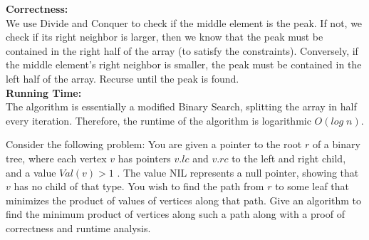 \documentclass[answers]{exam}
\begin{document}
\begin{questions}
\begin{algorithm}
	\DontPrintSemicolon
\end{algorithm}

{\bf Correctness:}\\
We use Divide and Conquer to check if the middle element is the peak. If not, we check if its right neighbor is larger, then we know that the peak must be contained in the right half of the array (to satisfy the constraints). Conversely, if the middle element's right neighbor is smaller, the peak must be contained in the left half of the array. Recurse until the peak is found.\\

{\bf Running Time:}\\
The algorithm is essentially a modified Binary Search, splitting the array in half every iteration. Therefore, the runtime of the algorithm is logarithmic $O(log\;n)$.\\


\vspace{0.2in}





\question[20]
Consider the following problem:  You are given a pointer to the root $r$ of a binary tree, where each vertex $v$
has pointers $v.lc$ and $v.rc$ to the left and right child, and a value $Val(v) > 1$ .  The value NIL represents
a null pointer, showing that $v$ has no child of that type.
You wish to find the path from $r$ to some leaf that minimizes the product of values of vertices along that path. Give an algorithm to find the minimum product of vertices along such a path along with a proof of correctness and runtime analysis.


\end{questions}
\end{document}
